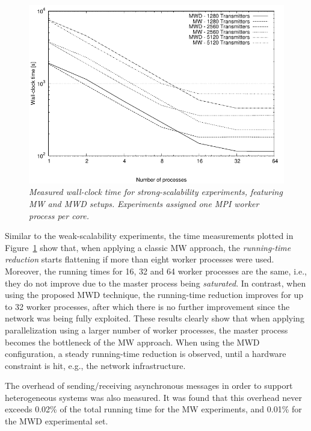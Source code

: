 \begin{figure}
\centering

\includegraphics[width=0.8\columnwidth]{04-framework_design_and_implementation/img/strong_scaling-time_plot}

\caption{\textit{\emph{Measured wall-clock time for strong-scalability experiments,
featuring MW and MWD setups.}}\textit{ }\textit{\emph{Experiments
assigned one MPI worker process per core. \label{fig:04-Strong_scalability_time}}}}
\end{figure}


Similar to the weak-scalability experiments, the time measurements
plotted in Figure~\ref{fig:04-Strong_scalability_time} show that,
when applying a classic MW approach, the \textit{\emph{running-time
reduction}} starts flattening if more than eight worker processes
were used. Moreover, the running times for 16, 32 and 64 worker processes
are the same, i.e., they do not improve due to the master process
being \textit{\emph{saturated}}. In contrast, when using the proposed
MWD technique, the running-time reduction improves for up to 32 worker
processes, after which there is no further improvement since the network
was being fully exploited. These results clearly show that when applying
parallelization using a larger number of worker processes, the master
process becomes the bottleneck of the MW approach. When using the
MWD configuration, a steady running-time reduction is observed, until
a hardware constraint is hit, e.g., the network infrastructure.

The overhead of sending/receiving asynchronous messages in order to
support heterogeneous systems was also measured. It was found that
this overhead never exceeds 0.02\% of the total running time for the
MW experiments, and 0.01\% for the MWD experimental set.


